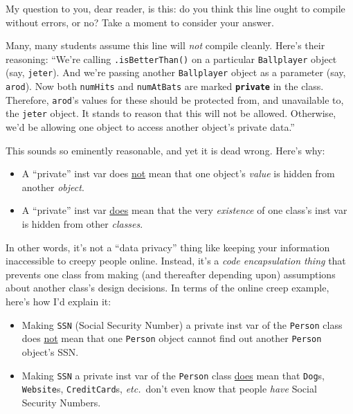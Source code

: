 My question to you, dear reader, is this: do you think this line ought to
compile without errors, or no? Take a moment to consider your answer.

Many, many students assume this line will \textit{not} compile cleanly. Here's
their reasoning: ``We're calling \texttt{.isBetterThan()} on a particular
\texttt{Ballplayer} object (say, \texttt{jeter}). And we're passing another
\texttt{Ballplayer} object as a parameter (say, \texttt{arod}). Now both
\texttt{numHits} and \texttt{numAtBats} are marked \textbf{\texttt{private}}
in the class. Therefore, \texttt{arod}'s values for these should be protected
from, and unavailable to, the \texttt{jeter} object. It stands to reason that
this will not be allowed. Otherwise, we'd be allowing one object to access
another object's private data.''

This sounds so eminently reasonable, and yet it is dead wrong. Here's why:

\begin{itemize}
\itemsep.1em
\item[{\color{darkred} \XSolidBold}] A ``private'' inst var does \underline{not} mean that one object's
\textit{value} is hidden from another \textit{object}.
\item[{\color{darkgreen} \CheckmarkBold}] A ``private'' inst var \underline{does} mean that the very
\textit{existence} of one class's inst var is hidden from other
\textit{classes}.
\end{itemize}

In other words, it's not a ``data privacy'' thing like keeping your information
inaccessible to creepy people online. Instead, it's a \textit{code
encapsulation thing} that prevents one class from making (and thereafter
depending upon) assumptions about another class's design decisions. In terms
of the online creep example, here's how I'd explain it:

\begin{itemize}
\itemsep.1em
\item[{\color{darkred} \XSolidBold}] Making \texttt{SSN} (Social Security Number) a private inst var of the
\texttt{Person} class does \underline{not} mean that one \texttt{Person} object
cannot find out another \texttt{Person} object's SSN.
\item[{\color{darkgreen} \CheckmarkBold}] Making \texttt{SSN} a private inst var of the \texttt{Person} class
\underline{does} mean that \texttt{Dog}s, \texttt{Website}s,
\texttt{CreditCard}s, \textit{etc.}~don't even know that people \textit{have}
Social Security Numbers.
\end{itemize}

